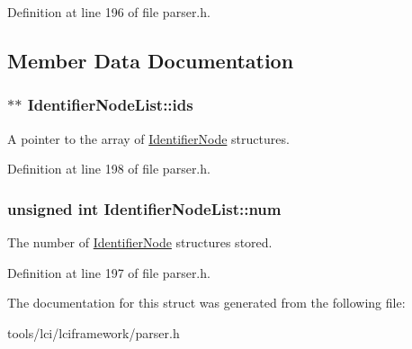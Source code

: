 Definition at line 196 of file parser.\-h.



\subsection{Member Data Documentation}
\hypertarget{struct_identifier_node_list_a61b371619c07f89846ae0780d5403dc0}{
\subsubsection[{ids}]{$\ast$$\ast$ {\bf Identifier\-Node\-List\-::ids}}}\label{struct_identifier_node_list_a61b371619c07f89846ae0780d5403dc0}
A pointer to the array of \hyperlink{struct_identifier_node}{Identifier\-Node} structures. 

Definition at line 198 of file parser.\-h.

\hypertarget{struct_identifier_node_list_a7ee19db1c4e05eafe5df277542e01dd1}{
\subsubsection[{num}]{\setlength{\rightskip}{0pt plus 5cm}unsigned int {\bf Identifier\-Node\-List\-::num}}}\label{struct_identifier_node_list_a7ee19db1c4e05eafe5df277542e01dd1}
The number of \hyperlink{struct_identifier_node}{Identifier\-Node} structures stored. 

Definition at line 197 of file parser.\-h.



The documentation for this struct was generated from the following file\-:\begin{DoxyCompactItemize}
\item 
tools/lci/lciframework/parser.\-h\end{DoxyCompactItemize}
